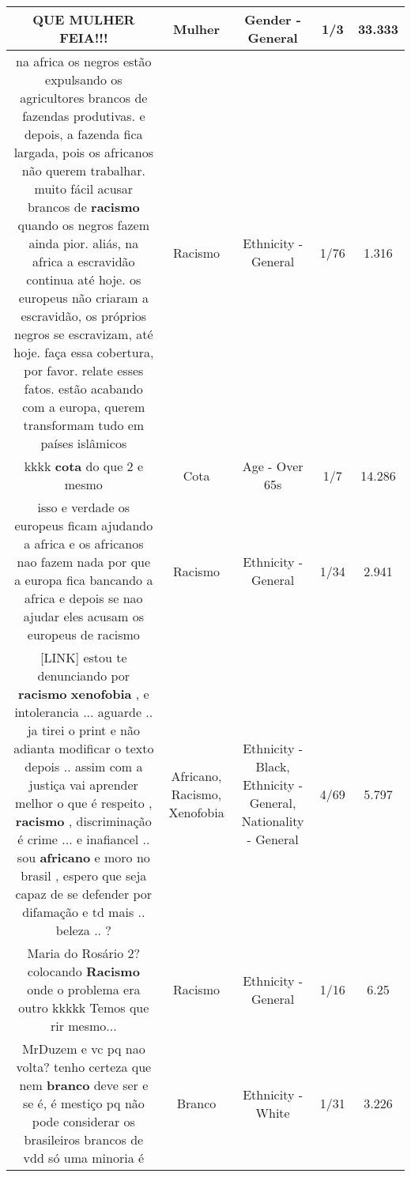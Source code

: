 \documentclass[11pt]{article}
\newlength\mylength
\begin{document}
\begin{center}
\begin{longtable}{|C{.65\mylength}|C{.30\mylength}|C{.12\mylength}|C{.12\mylength}|C{.12\mylength}|}
  \small QUE \textbf{MULHER} FEIA!!!\normalsize   & Mulher & Gender - General & 1/3 & 33.333 \\  \hline
  \small na africa os negros estão expulsando os agricultores brancos de fazendas produtivas. e depois, a fazenda fica largada, pois os africanos não querem trabalhar. muito fácil acusar brancos de \textbf{racismo} quando os negros fazem ainda pior. aliás, na africa a escravidão continua até hoje. os europeus não criaram a escravidão, os próprios negros se escravizam, até hoje. faça essa cobertura, por favor. relate esses fatos. estão acabando com a europa, querem transformam tudo em países islâmicos\normalsize   & Racismo & Ethnicity - General & 1/76 & 1.316 \\  \hline
  \small kkkk \textbf{cota} do que 2 e mesmo\normalsize   & Cota & Age - Over 65s & 1/7 & 14.286 \\  \hline
  \small isso e verdade os europeus ficam ajudando a africa e os africanos nao fazem nada por que a europa fica bancando a africa e depois se nao ajudar eles acusam os europeus de racismo\normalsize   & Racismo & Ethnicity - General & 1/34 & 2.941 \\  \hline
  \small  [LINK]   estou te denunciando por \textbf{racismo} \textbf{xenofobia} , e intolerancia ... aguarde .. ja tirei o print e não adianta modificar o texto depois .. assim com a justiça vai aprender melhor o que é respeito , \textbf{racismo} , discriminação é crime ... e inafiancel .. sou \textbf{africano} e moro no brasil , espero que seja capaz de se defender por difamação e td mais .. beleza .. ?\normalsize   & Africano, Racismo, Xenofobia & Ethnicity - Black, Ethnicity - General, Nationality - General & 4/69 & 5.797 \\  \hline
  \small Maria do Rosário 2? colocando \textbf{Racismo} onde o problema era outro kkkkk Temos que rir mesmo...\normalsize   & Racismo & Ethnicity - General & 1/16 & 6.25 \\  \hline
  \small MrDuzem e vc pq nao volta? tenho certeza que nem \textbf{branco} deve ser e se é, é mestiço pq não pode considerar os brasileiros brancos de vdd só uma minoria é\normalsize   & Branco & Ethnicity - White & 1/31 & 3.226 \\  \hline

\end{longtable}
\end{center}
\end{document}
